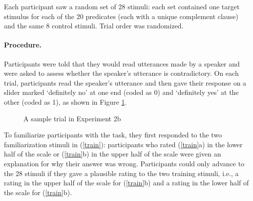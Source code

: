 \documentclass[11pt,fleqn]{article}
\newcommand{\6}{\mbox{$[\hspace*{-.6mm}[$}}
\newcommand{\9}{\mbox{$]\hspace*{-.6mm}]$}}
\begin{document}
{Each participant saw a random set of 28 stimuli: each set contained one target stimulus for each of the 20 predicates (each with a unique complement clause) and the same 8 control stimuli. Trial order was randomized.


\paragraph{Procedure.} Participants were told that they would read utterances made by a speaker and were asked to assess whether the speaker's utterance is contradictory. On each trial, participants read the speaker's utterance and then gave their response on a slider marked `definitely no' at one end (coded as 0) and `definitely yes' at the other (coded as 1), as shown in Figure \ref{f-trial-exp2}.

\begin{figure}[h!]
\begin{center}
\end{center}
\caption{A sample trial in Experiment 2b}\label{f-trial-exp2}
\end{figure}

To familiarize participants with the task, they first responded to the two familiarization stimuli in (\ref{train}): participants who rated (\ref{train}a) in the lower half of the scale or (\ref{train}b) in the upper half of the scale were given an explanation for why their answer was wrong. Participants could only advance to the 28 stimuli if they gave a plausible rating to the two training stimuli, i.e., a rating in the upper half of the scale for (\ref{train}b) and a rating in the lower half of the scale for (\ref{train}b).

}
\end{document}
